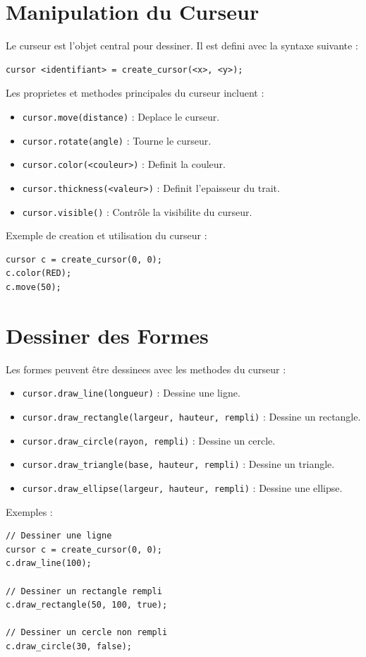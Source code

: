 \documentclass[12pt,a4paper]{report}
\begin{document}
\begin{itemize}
\end{itemize}

\section{Manipulation du Curseur}
Le curseur est l'objet central pour dessiner. Il est defini avec la syntaxe suivante :
\begin{lstlisting}[language=Draw++]
cursor <identifiant> = create_cursor(<x>, <y>);
\end{lstlisting}
Les proprietes et methodes principales du curseur incluent :
\begin{itemize}
    \item \texttt{cursor.move(distance)} : Deplace le curseur.
    \item \texttt{cursor.rotate(angle)} : Tourne le curseur.
    \item \texttt{cursor.color(<couleur>)} : Definit la couleur.
    \item \texttt{cursor.thickness(<valeur>)} : Definit l'epaisseur du trait.
    \item \texttt{cursor.visible()} : Contrôle la visibilite du curseur.
\end{itemize}

\newpage
Exemple de creation et utilisation du curseur :
\begin{lstlisting}[language=Draw++]
cursor c = create_cursor(0, 0);
c.color(RED);
c.move(50);
\end{lstlisting}

\section{Dessiner des Formes}
Les formes peuvent être dessinees avec les methodes du curseur :
\begin{itemize}
    \item \texttt{cursor.draw\_line(longueur)} : Dessine une ligne.
    \item \texttt{cursor.draw\_rectangle(largeur, hauteur, rempli)} : Dessine un rectangle.
    \item \texttt{cursor.draw\_circle(rayon, rempli)} : Dessine un cercle.
    \item \texttt{cursor.draw\_triangle(base, hauteur, rempli)} : Dessine un triangle.
    \item \texttt{cursor.draw\_ellipse(largeur, hauteur, rempli)} : Dessine une ellipse.
\end{itemize}
Exemples :
\begin{lstlisting}[language=Draw++]
// Dessiner une ligne
cursor c = create_cursor(0, 0);
c.draw_line(100);

// Dessiner un rectangle rempli
c.draw_rectangle(50, 100, true);

// Dessiner un cercle non rempli
c.draw_circle(30, false);
\end{lstlisting}
\end{document}
